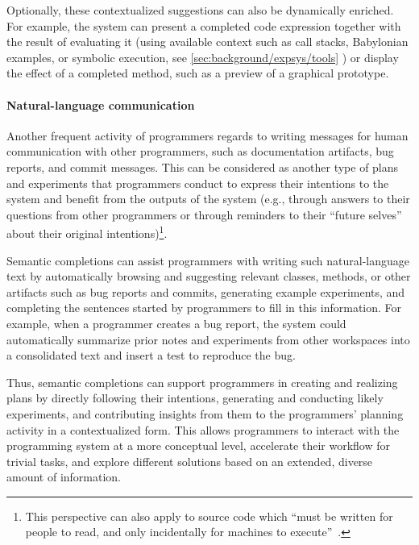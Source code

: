 Optionally, these contextualized suggestions can also be dynamically enriched.
For example, the system can present a completed code expression together with the result of evaluating it (using available context such as call stacks, Babylonian examples, or symbolic execution, see %
\cref{sec:background/expsys/tools}%
) or display the effect of a completed method, such as a preview of a graphical prototype.


\paragraph{Natural-language communication}
Another frequent activity of programmers regards to writing messages for human communication with other programmers, such as documentation artifacts, bug reports, and commit messages.
This can be considered as another type of plans and experiments that programmers conduct to express their intentions to the system and benefit from the outputs of the system (e.g., through answers to their questions from other programmers or through reminders to their ``future selves'' about their original intentions)\footnote{This perspective can also apply to source code which ``must be written for people to read,
and only incidentally for machines to execute''~\cite[p.~xxii]{abelson1996structure}.}.

Semantic completions can assist programmers with writing such natural-language text by automatically browsing and suggesting relevant classes, methods, or other artifacts such as bug reports and commits, generating example experiments, and completing the sentences started by programmers to fill in this information.
For example, when a programmer creates a bug report, the system could automatically summarize prior notes and experiments from other workspaces into a consolidated text and insert a test to reproduce the bug.

\ParSep

Thus, semantic completions can support programmers in creating and realizing plans by directly following their intentions, generating and conducting likely experiments, and contributing insights from them to the programmers' planning activity in a contextualized form.
This allows programmers to interact with the programming system at a more conceptual level, accelerate their workflow for trivial tasks, and explore different solutions based on an extended, diverse amount of information.

